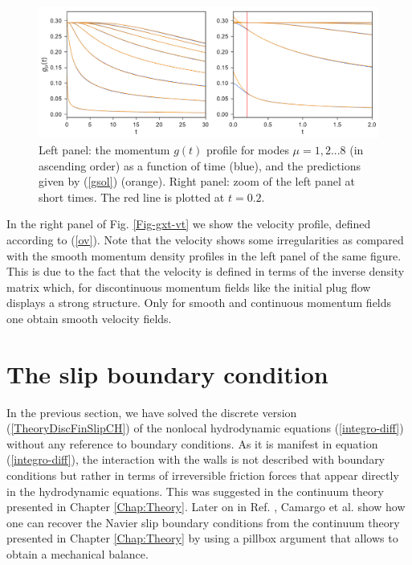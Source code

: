 \documentclass[b5paper,openright,10pt]{book}
\begin{document}
\begin{figure}[!h]
    \centering
\includegraphics[scale=0.41]{gxtPredictions-17nodes-WALLS}
\caption[The momentum profile as a function of time for a confined fluid - Thick bins]{Left  panel: the  momentum $g(t)$  profile for modes $\mu=1,2...8$ (in ascending order) as a function of time (blue), and the predictions given by (\ref{gsol}) (orange). Right panel: zoom of the left panel at short times. The red line is plotted at $t=0.2$.}
\label{Fig-gxtPredictions}
\end{figure}

In  the right panel of Fig.   \ref{Fig-gxt-vt}  we  show  the  velocity  profile,  defined
according  to   (\ref{ov}).   Note   that  the  velocity   shows  some
irregularities as  compared with the smooth  momentum density profiles
in the left panel of the same figure.  This is due to the fact  that the velocity
is  defined  in  terms  of  the  inverse  density  matrix  which,  for
discontinuous momentum fields like the  initial plug flow  displays a
strong structure. Only for smooth and continuous momentum fields one obtain
smooth velocity fields.


\section{The slip boundary condition}
\label{Sec:BC}
In  the  previous  section,  we   have  solved  the  discrete  version
(\ref{TheoryDiscFinSlipCH})   of   the  nonlocal   hydrodynamic   equations
(\ref{integro-diff}) without any reference to boundary conditions.  As
it is manifest in equation   (\ref{integro-diff}), the interaction with the
walls is not described with boundary conditions but rather in terms of
irreversible friction forces that  appear directly in the hydrodynamic
equations.  This  was suggested in  the continuum theory  presented in
Chapter \ref{Chap:Theory}. Later  on in Ref. \cite{CamargoBC2018}, Camargo et al. show how
one can recover the Navier slip boundary conditions from the continuum
theory presented in Chapter \ref{Chap:Theory}  by using  a pillbox  argument that
allows to obtain a mechanical balance.
\end{document}
